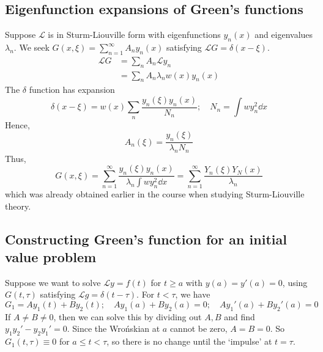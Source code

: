 \subsection{Eigenfunction expansions of Green's functions}
Suppose \( \mathcal L \) is in Sturm-Liouville form with eigenfunctions \( y_n(x) \) and eigenvalues \( \lambda_n \).
We seek \( G(x,\xi) = \sum_{n=1}^\infty A_n y_n(x) \) satisfying \( \mathcal L G = \delta(x-\xi) \).
\begin{align*}
	\mathcal L G & = \sum_n A_n \mathcal L y_n        \\
	             & = \sum_n A_n \lambda_n w(x) y_n(x)
\end{align*}
The \( \delta \) function has expansion
\[
	\delta(x-\xi) = w(x) \sum_n \frac{y_n(\xi) y_n(x)}{N_n};\quad N_n = \int w y_n^2 \dd{x}
\]
Hence,
\[
	A_n(\xi) = \frac{y_n(\xi)}{\lambda_n N_n}
\]
Thus,
\[
	G(x,\xi) = \sum_{n=1}^\infty \frac{y_n(\xi) y_n(x)}{\lambda_n \int w y_n^2 \dd{x}} = \sum_{n=1}^\infty \frac{Y_n(\xi) Y_N(x)}{\lambda_n}
\]
which was already obtained earlier in the course when studying Sturm-Liouville theory.

\subsection{Constructing Green's function for an initial value problem}
Suppose we want to solve \( \mathcal L y = f(t) \) for \( t \geq a \) with \( y(a) = y'(a) = 0 \), using \( G(t, \tau) \) satisfying \( \mathcal L g = \delta(t - \tau) \).
For \( t < \tau \), we have
\[
	G_1 = A y_1(t) + B y_2(t);\quad A y_1(a) + B y_2(a) = 0;\quad A y_1'(a) + B y_2'(a) = 0
\]
If \( A \neq B \neq 0 \), then we can solve this by dividing out \( A, B \) and find \( y_1 y_2' - y_2 y_1' = 0 \).
Since the Wro\'nskian at \( a \) cannot be zero, \( A = B = 0 \).
So \( G_1(t,\tau) \equiv 0 \) for \( a \leq t < \tau \), so there is no change until the `impulse' at \( t = \tau \).

